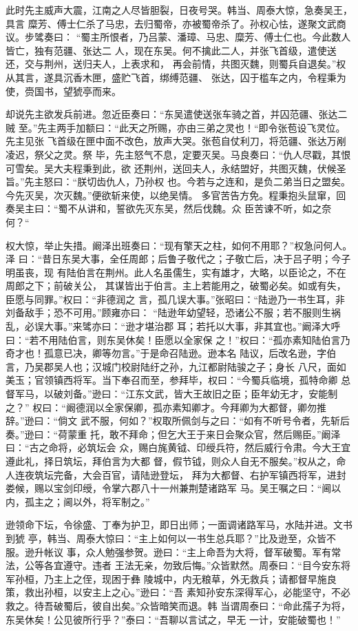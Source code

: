 此时先主威声大震，江南之人尽皆胆裂，日夜号哭。韩当、周泰大惊，急奏吴王，具言
糜芳、傅士仁杀了马忠，去归蜀帝，亦被蜀帝杀了。孙权心怯，遂聚文武商议。步骘奏曰：
“蜀主所恨者，乃吕蒙、潘璋、马忠、糜芳、傅士仁也。今此数人皆亡，独有范疆、张达二
人，现在东吴。何不擒此二人，并张飞首级，遣使送还，交与荆州，送归夫人，上表求和，
再会前情，共图灭魏，则蜀兵自退矣。”权从其言，遂具沉香木匣，盛贮飞首，绑缚范疆、
张达，囚于槛车之内，令程秉为使，赍国书，望猇亭而来。

却说先主欲发兵前进。忽近臣奏曰：“东吴遣使送张车骑之首，并囚范疆、张达二贼
至。”先主两手加额曰：“此天之所赐，亦由三弟之灵也！“即令张苞设飞灵位。先主见张
飞首级在匣中面不改色，放声大哭。张苞自仗利刀，将范疆、张达万剐凌迟，祭父之灵。祭
毕，先主怒气不息，定要灭吴。马良奏曰：“仇人尽戳，其恨可雪矣。吴大夫程秉到此，欲
还荆州，送回夫人，永结盟好，共图灭魏，伏候圣旨。”先主怒曰：“朕切齿仇人，乃孙权
也。今若与之连和，是负二弟当日之盟矣。今先灭吴，次灭魏。”便欲斩来使，以绝吴情。
多官苦告方免。程秉抱头鼠窜，回奏吴主曰：“蜀不从讲和，誓欲先灭东吴，然后伐魏。众
臣苦谏不听，如之奈何？“

权大惊，举止失措。阚泽出班奏曰：“现有擎天之柱，如何不用耶？”权急问何人。泽
曰：“昔日东吴大事，全任周郎；后鲁子敬代之；子敬亡后，决于吕子明；今子明虽丧，现
有陆伯言在荆州。此人名虽儒生，实有雄才，大略，以臣论之，不在周郎之下；前破关公，
其谋皆出于伯言。主上若能用之，破蜀必矣。如或有失，臣愿与同罪。”权曰：“非德润之
言，孤几误大事。”张昭曰：“陆逊乃一书生耳，非刘备敌手；恐不可用。”顾雍亦曰：
“陆逊年幼望轻，恐诸公不服；若不服则生祸乱，必误大事。”来骘亦曰：“逊才堪治郡
耳；若托以大事，非其宜也。”阚泽大呼曰：“若不用陆伯言，则东吴休矣！臣愿以全家保
之！”权曰：“孤亦素知陆伯言乃奇才也！孤意已决，卿等勿言。”于是命召陆逊。逊本名
陆议，后改名逊，字伯言，乃吴郡吴人也；汉城门校尉陆纡之孙，九江都尉陆骏之子；身长
八尺，面如美玉；官领镇西将军。当下奉召而至，参拜毕，权曰：“今蜀兵临境，孤特命卿
总督军马，以破刘备。”逊曰：“江东文武，皆大王故旧之臣；臣年幼无才，安能制之？”
权曰：“阚德润以全家保卿，孤亦素知卿才。今拜卿为大都督，卿勿推辞。”逊曰：“倘文
武不服，何如？”权取所佩剑与之曰：“如有不听号令者，先斩后奏。”逊曰：“荷蒙重
托，敢不拜命；但乞大王于来日会聚众官，然后赐臣。”阚泽曰：“古之命将，必筑坛会
众，赐白旄黄钺、印绶兵符，然后威行令肃。今大王宜遵此礼，择日筑坛，拜伯言为大都
督，假节钺，则众人自无不服矣。”权从之，命人连夜筑坛完备，大会百官，请陆逊登坛，
拜为大都督、右护军镇西将军，进封娄候，赐以宝剑印绶，令掌六郡八十一州兼荆楚诸路军
马。吴王嘱之曰：“阃以内，孤主之；阃以外，将军制之。”

逊领命下坛，令徐盛、丁奉为护卫，即日出师；一面调诸路军马，水陆并进。文书到猇
亭，韩当、周泰大惊曰：“主上如何以一书生总兵耶？”比及逊至，众皆不服。逊升帐议
事，众人勉强参贺。逊曰：“主上命吾为大将，督军破蜀。军有常法，公等各宜遵守。违者
王法无亲，勿致后悔。”众皆默然。周泰曰：“目今安东将军孙桓，乃主上之侄，现困于彝
陵城中，内无粮草，外无救兵；请都督早施良策，救出孙桓，以安主上之心。”逊曰：“吾
素知孙安东深得军心，必能坚守，不必救之。待吾破蜀后，彼自出矣。”众皆暗笑而退。韩
当谓周泰曰：“命此孺子为将，东吴休矣！公见彼所行乎？”泰曰：“吾聊以言试之，早无
一计，安能破蜀也！”

